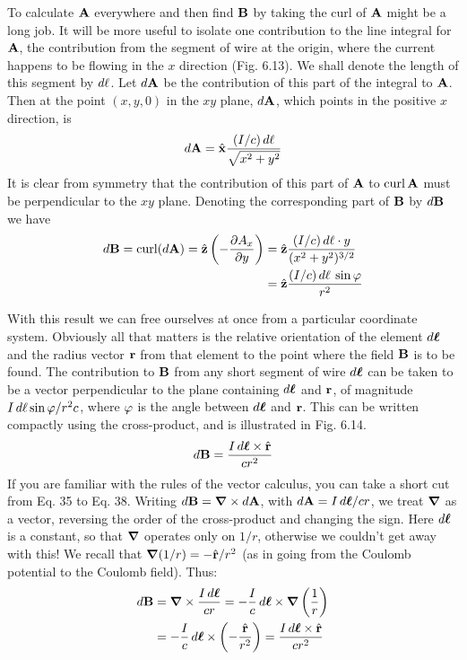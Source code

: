 To calculate $\mathbf{A}$ everywhere and then find $\mathbf{B}$ by taking the curl of $\mathbf{A}$
might be a long job. It will be more useful to isolate one contribution
to the line integral for $\mathbf{A}$, the contribution from the segment of
wire at the origin, where the current happens to be flowing in the
$x$ direction (Fig. 6.13). We shall denote the length of this segment
by $\mathop{d\!} \ell$. Let $\mathop{d\!}\mathbf{A}$ be the contribution of this part of the integral to $\mathbf{A}$.
Then at the point $(x,y,0)$ in the $xy$ plane, $\mathop{d\!}\mathbf{A}$, which points in the
positive $x$ direction, is
\begin{equation}
  \mathop{d\!}\mathbf{A} = \hat{\mathbf{x}} \frac{(I/c)\mathop{d\!}\ell}{\sqrt{x^2+y^2}}
\end{equation}
It is clear from symmetry that the contribution of this part of $\mathbf{A}$ to
$\operatorname{curl} \mathbf{A}$ must be perpendicular to the $xy$ plane. Denoting the corresponding
part of $\mathbf{B}$ by $\mathop{d\!}\mathbf{B}$ we have
\begin{align}
\begin{split}
  \mathop{d\!}\mathbf{B} = \operatorname{curl}(\mathop{d\!}\mathbf{A}) = \hat{\mathbf{z}}\left(-\frac{\partial A_x}{\partial y}\right)
        &= \hat{\mathbf{z}}\frac{(I/c)\mathop{d\!}\ell\cdot y}{(x^2+y^2)^{3/2}} \\
        &= \hat{\mathbf{z}}\frac{(I/c)\mathop{d\!}\ell\:\sin\varphi}{r^2} 
\end{split}
\end{align}

With this result we can free ourselves at once from a particular
coordinate system. Obviously all that matters is the relative orientation
of the element $\mathop{d\!}\boldsymbol{\ell}$ and the radius vector $\mathbf{r}$ from that element to
the point where the field $\mathbf{B}$ is to be found. The contribution to $\mathbf{B}$
from any short segment of wire $\mathop{d\!}\boldsymbol{\ell}$ can be taken to be a vector
perpendicular to the plane containing $\mathop{d\!}\boldsymbol{\ell}$ and $\mathbf{r}$, of magnitude
$I \mathop{d\!}\ell \sin \varphi/r^2c$, where $\varphi$ is the angle between $\mathop{d\!}\boldsymbol{\ell}$ and $\mathbf{r}$. This can be
written compactly using the cross-product, and is illustrated in
Fig. 6.14.
\begin{equation}
  \mathop{d\!}\mathbf{B} = \frac{I\mathop{d\!}\boldsymbol{\ell}\times \hat{\mathbf{r}}}{cr^2}
\end{equation}
If you are familiar with the rules of the vector calculus, you can take
a short cut from Eq. 35 to Eq. 38. Writing $\mathop{d\!}\mathbf{B} = \boldsymbol{\nabla} \times \mathop{d\!}\mathbf{A}$, with
$\mathop{d\!}\mathbf{A} = I\mathop{d\!}\boldsymbol{\ell}/cr$, we treat $\boldsymbol{\nabla}$ as a vector, reversing the order of the 
cross-product and changing the sign. Here $\mathop{d\!}\boldsymbol{\ell}$ is a constant, so that $\boldsymbol{\nabla}$
operates only on $1/r$, otherwise we couldn't get away with this! We
recall that $\boldsymbol{\nabla}( 1 /r) = -\hat{\mathbf{r}}/r^2$ (as in going from the Coulomb potential
to the Coulomb field). Thus:
\begin{align}
\begin{split}
  \mathop{d\!}\mathbf{B} &= \boldsymbol{\nabla}\times \frac{I\mathop{d\!}\boldsymbol{\ell}}{cr} = -\frac{I}{c}\mathop{d\!}\boldsymbol{\ell}\times\boldsymbol{\nabla}\left(\frac{1}{r}\right) \\
             &= -\frac{I}{c} \mathop{d\!}\boldsymbol{\ell}\times\left(-\frac{\hat{\mathbf{r}}}{r^2}\right)
                   = \frac{I\mathop{d\!}\boldsymbol{\ell}\times\hat{\mathbf{r}}}{cr^2}
\end{split}
\end{align}

